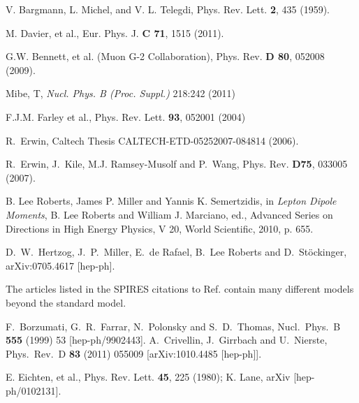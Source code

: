 \begin{thebibliography}{99}
 V. Bargmann, L.
Michel, and V. L. Telegdi, Phys. Rev. Lett. {\bf 2}, 435 (1959).

M. Davier, et al., Eur. Phys. J. {\bf C 71}, 1515 (2011).

 G.W. Bennett, et al. (Muon G-2 Collaboration),
 Phys. Rev. {\bf D 80}, 052008 (2009).




Mibe, T, \textit{Nucl. Phys. B (Proc. Suppl.)}
218:242 (2011)






  F.J.M. Farley et al.,
Phys. Rev. Lett. {\bf 93}, 052001 (2004)

 R.~Erwin,
Caltech Thesis CALTECH-ETD-05252007-084814 (2006).

 R.~Erwin, J.~Kile, M.J. Ramsey-Musolf and P.~Wang,
Phys. Rev. {\bf D75}, 033005 (2007).

 B. Lee Roberts, James P. Miller and Yannis
  K. Semertzidis, in {\it Lepton Dipole Moments}, B. Lee Roberts and William
  J. Marciano, ed., Advanced Series on Directions in High Energy Physics, V
  20, World Scientific, 2010, p. 655.



 D.~W.~Hertzog, J.~P.~Miller, E.~de Rafael, B.~Lee
Roberts and D.~St\"ockinger,
arXiv:0705.4617 [hep-ph]. %


  The articles listed in the
SPIRES citations to  Ref. \cite{Brown:2001mg} contain many different
models beyond the standard model.

  F.~Borzumati, G.~R.~Farrar, N.~Polonsky and S.~D.~Thomas,
  Nucl.\ Phys.\ B {\bf 555} (1999) 53
  [hep-ph/9902443].
  A.~Crivellin, J.~Girrbach and U.~Nierste,
  Phys.\ Rev.\ D {\bf 83} (2011) 055009
  [arXiv:1010.4485 [hep-ph]].

 E. Eichten, et al., Phys. Rev. Lett. {\bf 45}, 225 (1980);
K. Lane, arXiv [hep-ph/0102131].


\end{thebibliography}
